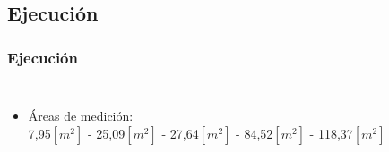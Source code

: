 \documentclass[mathserif]{beamer}
\begin{document}
\subsection{Ejecución}
\begin{frame}
\frametitle{Ejecución}

\begin{columns}


\begin{itemize}

\item Áreas de medición: \\7,95$[m^2]$ - 25,09$[m^2]$ - 27,64$[m^2]$ - 84,52$[m^2]$ - 118,37$[m^2]$

\end{itemize}




\end{columns}
\end{frame}
\end{document}
